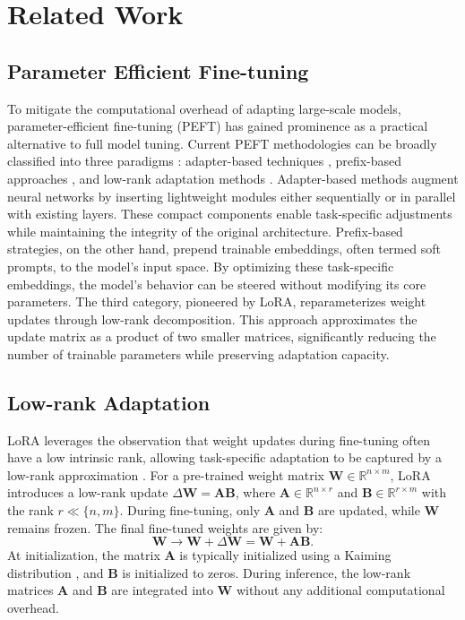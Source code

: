 \section{Related Work}

\subsection{Parameter Efficient Fine-tuning}
To mitigate the computational overhead of adapting large-scale models, parameter-efficient fine-tuning (PEFT) has gained prominence as a practical alternative to full model tuning. Current PEFT methodologies can be broadly classified into three paradigms \cite{ding2023parameter}: adapter-based techniques \cite{zhang2022adaptive,chen2022adaptformer,pfeiffer2020adapterfusion,he2021towards}, prefix-based approaches \cite{li2021prefix,fischer2024prompt,liu2023gpt,lester2021power,razdaibiedina2023residual,shi2023dept}, and low-rank adaptation methods \cite{hu2021lora,hyeon2021fedpara,liu2024dora,qiu2023controlling,renduchintala2023tied,kopiczko2023vera,yeh2023navigating,zhang2022adaptive}.
Adapter-based methods augment neural networks by inserting lightweight modules either sequentially or in parallel with existing layers.
These compact components enable task-specific adjustments while maintaining the integrity of the original architecture. 
Prefix-based strategies, on the other hand, prepend trainable embeddings, often termed soft prompts, to the model's input space. 
By optimizing these task-specific embeddings, the model's behavior can be steered without modifying its core parameters.
The third category, pioneered by LoRA, reparameterizes weight updates through low-rank decomposition. 
This approach approximates the update matrix as a product of two smaller matrices, significantly reducing the number of trainable parameters while preserving adaptation capacity.

\subsection{Low-rank Adaptation}
LoRA leverages the observation that weight updates during fine-tuning often have a low intrinsic rank, allowing task-specific adaptation to be captured by a low-rank approximation \cite{aghajanyan2020intrinsic, li2018measuring}. 
For a pre-trained weight matrix $\mathbf{W} \in \mathbb{R}^{n \times m}$, LoRA introduces a low-rank update $\Delta \mathbf{W} =\mathbf{A} \mathbf{B}$, where $\mathbf{A} \in \mathbb{R}^{n \times r}$ and $\mathbf{B} \in \mathbb{R}^{r \times m}$  with the rank $r \ll \{n,m\}$. 
During fine-tuning, only $\mathbf{A}$ and $\mathbf{B}$ are updated, while $\mathbf{W}$ remains frozen. 
The final fine-tuned weights are given by:
\begin{equation}
\mathbf{W} \rightarrow \mathbf{W} + \Delta \mathbf{W} = \mathbf{W} + \mathbf{A}\mathbf{B}.
\label{eq lora}
\end{equation}
At initialization, the matrix $\mathbf{A}$ is typically initialized using a Kaiming distribution \cite{he2015delving}, and $\mathbf{B}$ is initialized to zeros. 
During inference, the low-rank matrices $\mathbf{A}$ and $\mathbf{B}$ are integrated into $\mathbf{W}$ without any additional computational overhead. 

